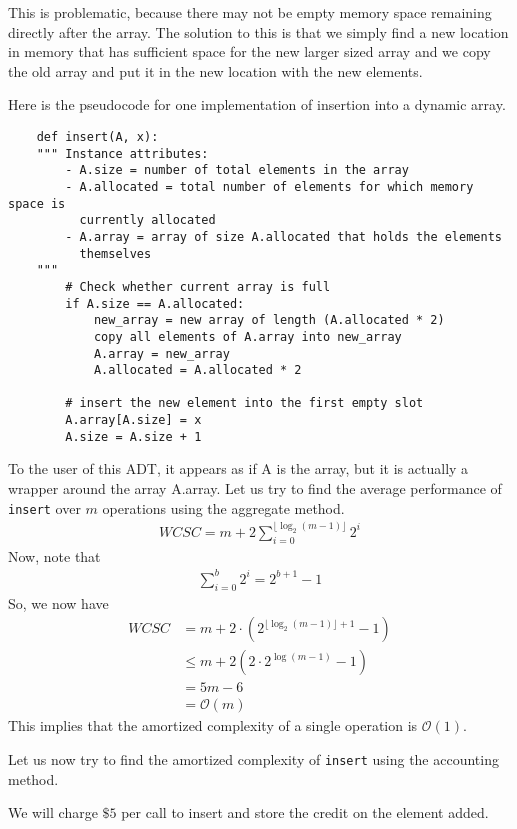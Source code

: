 \documentclass[11pt]{article}
\begin{document}
This is problematic, because there may not be empty memory space remaining directly after the array. The solution to this is that we simply find a new location in memory that has sufficient space for the new larger sized array and we copy the old array and put it in the new location with the new elements. 

Here is the pseudocode for one implementation of insertion into a dynamic array. 
\begin{verbatim}
    def insert(A, x): 
    """ Instance attributes: 
        - A.size = number of total elements in the array 
        - A.allocated = total number of elements for which memory space is 
          currently allocated
        - A.array = array of size A.allocated that holds the elements
          themselves
    """
        # Check whether current array is full 
        if A.size == A.allocated: 
            new_array = new array of length (A.allocated * 2) 
            copy all elements of A.array into new_array
            A.array = new_array
            A.allocated = A.allocated * 2
        
        # insert the new element into the first empty slot 
        A.array[A.size] = x
        A.size = A.size + 1
\end{verbatim}
To the user of this ADT, it appears as if A is the array, but it is actually a wrapper around the array A.array. Let us try to find the average performance of \texttt{insert} over $m$ operations using the aggregate method. 
\begin{align*}
    WCSC = m + 2\sum_{i=0}^{\lfloor \log_2 (m-1) \rfloor } 2^i
\end{align*}
Now, note that 
\begin{align*}
    \sum_{i=0}^b 2^i = 2^{b+1} - 1
\end{align*}
So, we now have
\begin{align*}
    WCSC &= m + 2\cdot (2^{\lfloor \log_2 (m-1) \rfloor +1} - 1) \\
    &\leq m + 2(2\cdot 2^{\log(m-1)} - 1) \\
    &= 5m -6 \\
    &= \mathcal{O}(m) 
\end{align*}
This implies that the amortized complexity of a single operation is $\mathcal{O}(1)$. 

Let us now try to find the amortized complexity of \texttt{insert} using the accounting method. 

We will charge $\$ 5$ per call to insert and store the credit on the element added. 
\end{document}
